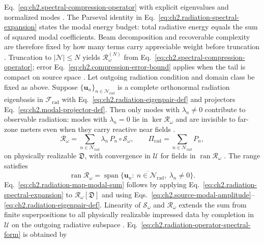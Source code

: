 Eq.~\eqref{eq:ch2.spectral-compression-operator} with explicit eigenvalues and normalized
modes \cite{stratton1941}. The Parseval identity in
Eq.~\eqref{eq:ch2.radiation-spectral-expansion} states the modal energy budget: total radiative
energy equals the sum of squared modal coefficients. Beam decomposition and recoverable
complexity are therefore fixed by how many terms carry appreciable weight before truncation
\cite{hansen1988}. Truncation to \(|\mathcal{N}|\le N\) yields
\(\mathcal{R}_\omega^{(N)}\) from Eq.~\eqref{eq:ch2.spectral-compression-operator}; error
Eq.~\eqref{eq:ch2.compression-error-bound} applies when the tail is compact on source space
\cite{harrington2001}.
\label{thm:ch2.radiation-spectral-decomposition}
Let outgoing radiation condition and domain class be fixed as above. Suppose
\(\{\mathbf{u}_n\}_{n\in\mathcal{N}_{\mathrm{rad}}}\) is a complete orthonormal radiation
eigenbasis in \(\mathcal{F}_{\mathrm{rad}}\) with
Eq.~\eqref{eq:ch2.radiation-eigenpair-def} and projectors
Eq.~\eqref{eq:ch2.modal-projector-def}. Then only modes with $\lambda_n\neq 0$ contribute to
observable radiation: modes with $\lambda_n=0$ lie in $\ker\mathcal{R}_\omega$ and are invisible
to far-zone meters even when they carry reactive near fields \cite{devaney2004}.
\begin{equation}
\label{eq:ch2.radiation-operator-spectral-form}
\mathcal{R}_\omega
=
\sum_{n\in\mathcal{N}_{\mathrm{rad}}}
\lambda_n\,P_n\circ\mathcal{S}_\omega,
\qquad
\Pi_{\mathrm{rad}}
=
\sum_{n\in\mathcal{N}_{\mathrm{rad}}} P_n,
\end{equation}
on physically realizable \(\mathfrak{D}\), with convergence in \(\mathcal{U}\) for fields in
\(\operatorname{ran}\mathcal{R}_\omega\) \cite{stratton1941}. The range
satisfies
\begin{equation}
\label{eq:ch2.radiation-range-span}
\operatorname{ran}\mathcal{R}_\omega
=
\overline{\operatorname{span}\{\mathbf{u}_n:\ n\in\mathcal{N}_{\mathrm{rad}},\ \lambda_n\neq 0\}}.
\end{equation}
Eq.~\eqref{eq:ch2.radiation-map-modal-sum} follows by applying
Eq.~\eqref{eq:ch2.radiation-spectral-expansion} to
\(\mathcal{R}_\omega[\mathfrak{D}]\) and using
Eqs.~\eqref{eq:ch2.source-modal-amplitude}--\eqref{eq:ch2.radiation-eigenpair-def}.
Linearity of \(\mathcal{S}_\omega\) and \(\mathcal{R}_\omega\) extends the sum from finite
superpositions to all physically realizable impressed data by completion in \(\mathcal{U}\) on the
outgoing radiative subspace
\cite{stratton1941}. Eq.~\eqref{eq:ch2.radiation-operator-spectral-form} is obtained by
